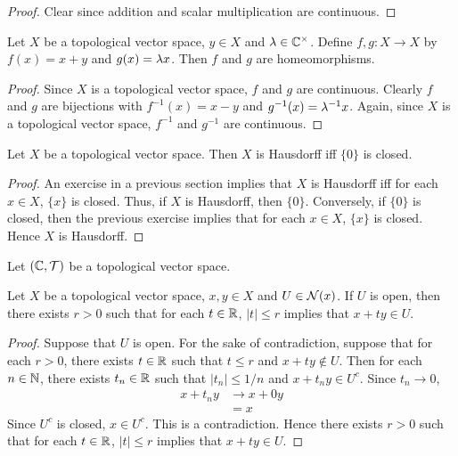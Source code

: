 \documentclass{book}
\begin{document}
	\begin{proof}
		Clear since addition and scalar multiplication are continuous.
	\end{proof}
	
	\begin{ex}
		Let $X$ be a topological vector space, $y \in X$ and $\lambda \in \mathbb{C}^{\times}$. Define $f,g: X \rightarrow X$ by $f(x) = x + y$ and $g(x) = \lambda x$. Then $f$ and $g$ are homeomorphisms. 
	\end{ex}
	
	\begin{proof}
		Since $X$ is a topological vector space, $f$ and $g$ are continuous. Clearly $f$ and $g$ are bijections with $f^{-1}(x) = x - y$ and $g^{-1}(x) = \lambda^{-1}x$. Again, since $X$ is a topological vector space, $f^{-1}$ and $g^{-1}$ are continuous.
	\end{proof}

	\begin{ex}
		Let $X$ be a topological vector space. Then $X$ is Hausdorff iff $\{0\}$ is closed.
	\end{ex}

	\begin{proof}
		An exercise in a previous section implies that $X$ is Hausdorff iff for each $x \in X$, $\{x\}$ is closed. Thus, if $X$ is Hausdorff, then $\{0\}$. Conversely, if $\{0\}$ is closed, then the previous exercise implies that for each $x \in X$, $\{x\}$ is closed. Hence $X$ is Hausdorff.
	\end{proof}
	
	\begin{ex}
		Let $(\mathbb{C}, \mathcal{T})$ be a topological vector space.  
	\end{ex}
	
	\begin{ex}
		Let $X$ be a topological vector space, $x,y \in X$ and $U \in \mathcal{N}(x)$. If $U$ is open, then there exists $r >0$ such that for each $t \in \mathbb{R}$, $|t| \leq r$ implies that $x+ ty \in U$.
	\end{ex}

	\begin{proof}
		Suppose that $U$ is open. For the sake of contradiction, suppose that for each $r > 0$, there exists $t \in \mathbb{R}$ such that $t \leq r$ and $x+ ty \not \in U$. Then for each $n \in \mathbb{N}$, there exists $t_n \in \mathbb{R}$ such that $|t_n| \leq 1/n$ and $x + t_ny \in U^c$. Since $t_n \rightarrow 0$, 
		\begin{align*}
			x + t_ny 
			& \rightarrow x + 0y \\
			&= x
		\end{align*}
		Since $U^c$ is closed, $x \in U^c$. This is a contradiction. Hence there exists $r >0$ such that for each $t \in \mathbb{R}$, $|t| \leq r$ implies that $x+ ty \in U$.
	\end{proof}
\end{document}
